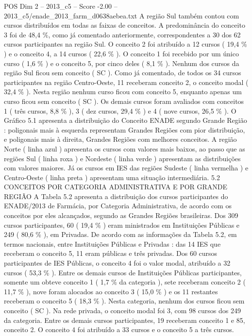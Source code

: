\begin{textsample}{POS Dim 2 – 2013\_c5 – Score -2.00 – 2013\_c5/enade\_2013\_farm\_d0638aebea.txt}
A região Sul também contou com cursos distribuídos em todas as faixas de conceitos.
A predominância do conceito 3 foi de 48,4 \%, como já comentado anteriormente, correspondentes a 30 dos 62 cursos participantes na região Sul.
O conceito 2 foi atribuído a 12 cursos ( 19,4 \% ) e o conceito 4, a 14 cursos ( 22,6 \% ).
O conceito 1 foi recebido por um único curso ( 1,6 \% ) e o conceito 5, por cinco deles ( 8,1 \% ).
Nenhum dos cursos da região Sul ficou sem conceito ( SC ).
Como já comentado, de todos os 34 cursos participantes na região Centro-Oeste, 11 receberam conceito 2, o conceito modal ( 32,4 \% ).
Nesta região nenhum curso ficou com conceito 5, enquanto apenas um curso ficou sem conceito ( SC ).
Os demais cursos foram avaliados com conceitos 1 ( três cursos, 8,8 \% ), 3 ( dez cursos, 29,4 \% ) e 4 ( nove cursos, 26,5 \% ).
O Gráfico 5.1 apresenta a distribuição do Conceito ENADE segundo Grande Região : poligonais mais à esquerda representam Grandes Regiões com pior distribuição, e poligonais mais à direita, Grandes Regiões com melhores conceitos.
A região Norte ( linha azul ) apresenta os cursos com valores mais baixos, ao passo que as regiões Sul ( linha roxa ) e Nordeste ( linha verde ) apresentam as distribuições com valores maiores.
Já os cursos em IES das regiões Sudeste ( linha vermelha ) e Centro-Oeste ( linha preta ) apresentam uma situação intermediária. 5.2 CONCEITOS POR CATEGORIA ADMINISTRATIVA E POR GRANDE REGIÃO A Tabela 5.2 apresenta a distribuição dos cursos participantes do ENADE/2013 de Farmácia, por Categoria Administrativa, de acordo com os conceitos por eles alcançados, segundo as Grandes Regiões brasileiras.
Dos 309 cursos participantes, 60 ( 19,4 \% ) eram ministrados em Instituições Públicas e 249 ( 80,6 \% ), em Privadas.
De acordo com as informações da Tabela 5.2, em termos nacionais, entre Instituições Públicas e Privadas : das 14 IES que receberam o conceito 5, 11 eram públicas e três privadas.
Dos 60 cursos participantes de IES Públicas, o conceito 4 foi o valor modal, atribuído a 32 cursos ( 53,3 \% ).
Entre os demais cursos de Instituições Públicas participantes, somente um obteve conceito 1 ( 1,7 \% da categoria ), sete receberam conceito 2 ( 11,7 \% ), nove foram alocados ao conceito 3 ( 15,0 \% ) e os 11 restantes receberam o conceito 5 ( 18,3 \% ).
Nesta categoria, nenhum dos cursos ficou sem conceito ( SC ).
Na rede privada, o conceito modal foi 3, com 98 cursos dos 249 da categoria.
Entre os demais cursos participantes, 19 receberam conceito 1 e 85, conceito 2.
O conceito 4 foi atribuído a 33 cursos e o conceito 5 a três cursos.

\end{textsample}
